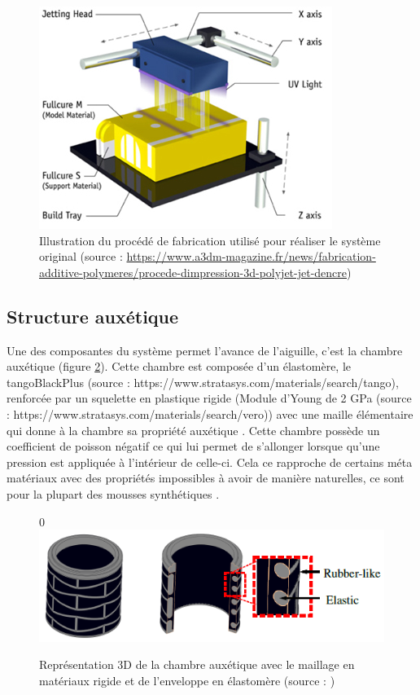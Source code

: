 \documentclass[10pt, a4paper]{article}
\begin{document}
\begin{figure}[ht!]
\centering
\includegraphics[scale=0.5]{ImageIntro/polyjet_process2.jpg}
\caption{ Illustration du procédé de fabrication utilisé pour réaliser le système original (source : \url{https://www.a3dm-magazine.fr/news/fabrication-additive-polymeres/procede-dimpression-3d-polyjet-jet-dencre})}
\label{fig:fabPoly}
\end{figure}        

    \subsection{Structure auxétique}
    
         Une des composantes du système permet l'avance de l'aiguille, c'est la chambre auxétique (figure \ref{fig:maillageAux}). Cette chambre est composée d'un élastomère, le tangoBlackPlus (source : https://www.stratasys.com/materials/search/tango), renforcée par un squelette en plastique rigide (Module d'Young de 2 GPa (source : https://www.stratasys.com/materials/search/vero))  avec une maille élémentaire qui donne à la chambre sa propriété auxétique \cite{Karnessis2013}. Cette chambre possède un coefficient de poisson négatif ce qui lui permet de s'allonger lorsque qu'une pression est appliquée à l'intérieur de celle-ci. Cela ce rapproche de certains méta matériaux avec des propriétés impossibles à avoir de manière naturelles, ce sont pour la plupart des mousses synthétiques \cite{Ashby1983}. 
        
\begin{figure}[ht!]0
\centering
\includegraphics[scale=0.8]{ImageIntro/mailleAux.PNG}
\caption{ Représentation 3D de la chambre auxétique avec le maillage en matériaux rigide et de l'enveloppe en élastomère (source : \cite{Pfeil2018}) }
\label{fig:maillageAux}
\end{figure} 
        
\end{document}
